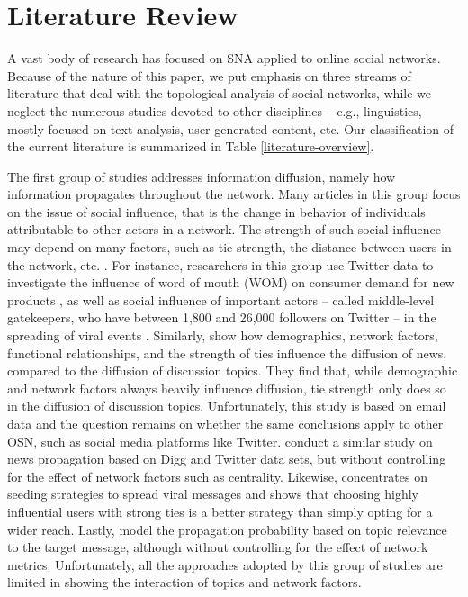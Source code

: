 \section{Literature Review}\label{Literature}\thispagestyle{SectionFirstPage} %

A vast body of research has focused on SNA applied to online social networks. Because of the nature of this paper, we put emphasis on three streams of literature that deal with the topological analysis of social networks, while we neglect the numerous studies devoted to other disciplines – e.g., linguistics, mostly focused on text analysis, user generated content, etc. Our classification of the current literature is summarized in Table \vref{literature-overview}.

The first group of studies addresses information diffusion, namely how information propagates throughout the network. Many articles in this group focus on the issue of social influence, that is the change in behavior of individuals attributable to other actors in a network. The strength of such social influence may depend on many factors, such as tie strength, the distance between users in the network, etc. \citep{aggarwal:2011}.
For instance, researchers in this group use Twitter data to investigate the influence of word of mouth (WOM) on consumer demand for new products \citep{deer:2019}, as well as social influence of important actors – called middle-level gatekeepers, who have between 1,800 and 26,000 followers on Twitter – in the spreading of viral events \citep{hemsley:2019}.
Similarly, \citet{aral:2007} show how demographics, network factors, functional relationships, and the strength of ties influence the diffusion of news, compared to the diffusion of discussion topics. They find that, while demographic and network factors always heavily influence diffusion, tie strength only does so in the diffusion of discussion topics. Unfortunately, this study is based on email data and the question remains on whether the same conclusions apply to other OSN, such as social media platforms like Twitter. \citet{lerman:2010} conduct a similar study on news propagation based on Digg and Twitter data sets, but without controlling for the effect of network factors such as centrality. Likewise, \citet{liu-thompkins:2012} concentrates on seeding strategies to spread viral messages and shows that choosing highly influential users with strong ties is a better strategy than simply opting for a wider reach. Lastly, \citet{zhang:2013} model the propagation probability based on topic relevance to the target message, although without controlling for the effect of network metrics. Unfortunately, all the approaches adopted by this group of studies are limited in showing the interaction of topics and network factors.


